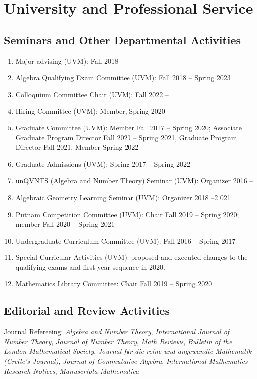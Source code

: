 \documentclass[a4paper,10pt]{article}
\begin{document}
\section*{University and Professional Service}
\subsection*{Seminars and Other Departmental Activities}

\begin{enumerate}
	\item Major advising (UVM): Fall 2018 --
	\item Algebra Qualifying Exam Committee (UVM): Fall 2018 -- Spring 2023
	\item Colloquium Committee Chair (UVM): Fall 2022 --
	\item Hiring Committee (UVM): Member, Spring 2020
	\item Graduate Committee (UVM): Member Fall 2017 -- Spring 2020; Associate Graduate Program Director Fall 2020 -- Spring 2021, Graduate Program Director Fall 2021, Member Spring 2022 -- 
	\item Graduate Admissions (UVM): Spring 2017 -- Spring 2022
	\item unQVNTS (Algebra and Number Theory) Seminar (UVM): Organizer 2016 --
	\item Algebraic Geometry Learning Seminar (UVM): Organizer 2018 --2 021
	\item Putnam Competition Committee (UVM): Chair Fall 2019 -- Spring 2020; member Fall 2020 -- Spring 2021
	\item Undergraduate Curriculum Committee (UVM): Fall 2016 -- Spring 2017 
	\item Special Curricular Activities (UVM): proposed and executed changes to the qualifying exams and first year sequence in 2020. 
	\item Mathematics Library Committee:  Chair Fall 2019 -- Spring 2020
\end{enumerate}

\subsection*{Editorial and Review Activities}
Journal Refereeing: \emph{Algebra and Number Theory}, \emph{International Journal of Number Theory}, \emph{Journal of Number Theory}, \emph{Math Reviews}, \emph{Bulletin of the London Mathematical Society},  \emph{Journal für die reine und angewandte Mathematik (Crelle’s Journal)}, \emph{Journal of Commutative Algebra}, \emph{International Mathematics Research Notices}, \emph{Manuscripta Mathematica}
\end{document}
